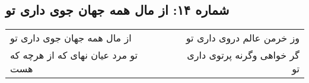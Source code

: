 \begin{center}
\section*{شماره ۱۴: از مال همه جهان جوی داری تو}
\label{sec:014}
\begin{longtable}{l p{0.5cm} r}
از مال همه جهان جوی داری تو
&&
وز خرمن عالم دروی داری تو
\\
تو مرد عیان نهای که از هرچه که هست
&&
گر خواهی وگرنه پرتوی داری تو
\\
\end{longtable}
\end{center}
